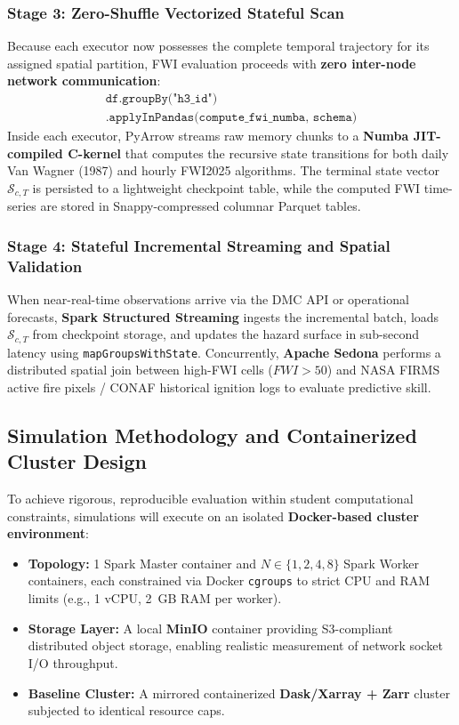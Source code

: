 \documentclass[10pt,conference]{IEEEtran}
\begin{document}
\subsubsection{Stage 3: Zero-Shuffle Vectorized Stateful Scan}
Because each executor now possesses the complete temporal trajectory for its assigned spatial partition, FWI evaluation proceeds with \textbf{zero inter-node network communication}:
\begin{equation*}
\begin{split}
\texttt{df.groupBy("h3\_id")} \\
\texttt{.applyInPandas(compute\_fwi\_numba, schema)}
\end{split}
\end{equation*}
Inside each executor, PyArrow streams raw memory chunks to a \textbf{Numba JIT-compiled C-kernel} that computes the recursive state transitions for both daily Van Wagner (1987) and hourly FWI2025 algorithms. The terminal state vector $\mathcal{S}_{c,T}$ is persisted to a lightweight checkpoint table, while the computed FWI time-series are stored in Snappy-compressed columnar Parquet tables.

\subsubsection{Stage 4: Stateful Incremental Streaming and Spatial Validation}
When near-real-time observations arrive via the DMC API or operational forecasts, \textbf{Spark Structured Streaming} ingests the incremental batch, loads $\mathcal{S}_{c,T}$ from checkpoint storage, and updates the hazard surface in sub-second latency using \texttt{mapGroupsWithState}. Concurrently, \textbf{Apache Sedona} performs a distributed spatial join between high-FWI cells ($FWI > 50$) and NASA FIRMS active fire pixels / CONAF historical ignition logs to evaluate predictive skill.

\subsection{Simulation Methodology and Containerized Cluster Design}
To achieve rigorous, reproducible evaluation within student computational constraints, simulations will execute on an isolated \textbf{Docker-based cluster environment}:
\begin{itemize}
    \item \textbf{Topology:} 1 Spark Master container and $N \in \{1, 2, 4, 8\}$ Spark Worker containers, each constrained via Docker \texttt{cgroups} to strict CPU and RAM limits (e.g., 1 vCPU, 2~GB RAM per worker).
    \item \textbf{Storage Layer:} A local \textbf{MinIO} container providing S3-compliant distributed object storage, enabling realistic measurement of network socket I/O throughput.
    \item \textbf{Baseline Cluster:} A mirrored containerized \textbf{Dask/Xarray + Zarr} cluster subjected to identical resource caps.
\end{itemize}
\end{document}

